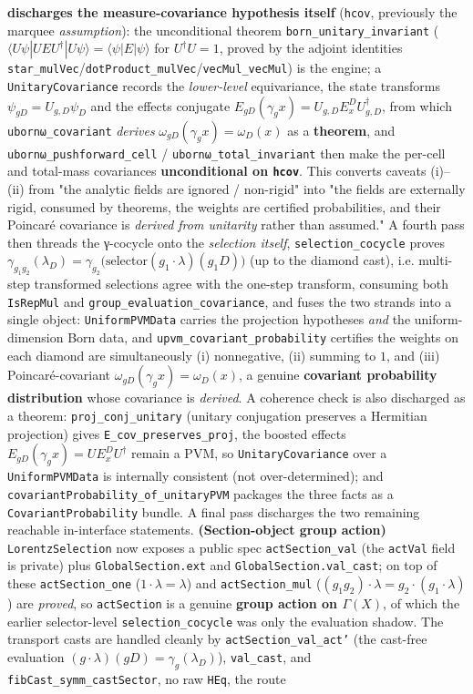 \documentclass[11pt,a4paper]{article}
\begin{document}
\begin{itemize}
\textbf{discharges the measure-covariance hypothesis itself} (\texttt{hcov}, previously the marquee \emph{assumption}): the unconditional theorem \texttt{born\_unitary\_invariant} ($\langle U\psi|UEU^\dagger|U\psi\rangle=\langle\psi|E|\psi\rangle$ for $U^\dagger U=1$, proved by the adjoint identities \texttt{star\_mulVec}/\texttt{dotProduct\_mulVec}/\texttt{vecMul\_vecMul}) is the engine; a \texttt{UnitaryCovariance} records the \emph{lower-level} equivariance, the state transforms $\psi_{gD}=U_{g,D}\psi_D$ and the effects conjugate $E_{gD}(\gamma_g x)=U_{g,D}E_x^D U_{g,D}^\dagger$, from which \texttt{ubornω\_covariant} \emph{derives} $\omega_{gD}(\gamma_g x)=\omega_D(x)$ as a \textbf{theorem}, and \texttt{ubornω\_pushforward\_cell} / \texttt{ubornω\_total\_invariant} then make the per-cell and total-mass covariances \textbf{unconditional on \texttt{hcov}}. This converts caveats (i)–(ii) from "the analytic fields are ignored / non-rigid" into "the fields are externally rigid, consumed by theorems, the weights are certified probabilities, and their Poincaré covariance is \emph{derived from unitarity} rather than assumed." A fourth pass then threads the γ-cocycle onto the \emph{selection itself}, \texttt{selection\_cocycle} proves $\gamma_{g_1 g_2}(\lambda_D)=\gamma_{g_2}\big(\text{selector}(g_1\!\cdot\!\lambda)(g_1 D)\big)$ (up to the diamond cast), i.e. multi-step transformed selections agree with the one-step transform, consuming both \texttt{IsRepMul} and \texttt{group\_evaluation\_covariance}, and fuses the two strands into a single object: \texttt{UniformPVMData} carries the projection hypotheses \emph{and} the uniform-dimension Born data, and \texttt{upvm\_covariant\_probability} certifies the weights on each diamond are simultaneously (i) nonnegative, (ii) summing to $1$, and (iii) Poincaré-covariant $\omega_{gD}(\gamma_g x)=\omega_D(x)$, a genuine \textbf{covariant probability distribution} whose covariance is \emph{derived}. A coherence check is also discharged as a theorem: \texttt{proj\_conj\_unitary} (unitary conjugation preserves a Hermitian projection) gives \texttt{E\_cov\_preserves\_proj}, the boosted effects $E_{gD}(\gamma_g x)=U E_x^D U^\dagger$ remain a PVM, so \texttt{UnitaryCovariance} over a \texttt{UniformPVMData} is internally consistent (not over-determined); and \texttt{covariantProbability\_of\_unitaryPVM} packages the three facts as a \texttt{CovariantProbability} bundle. A final pass discharges the two remaining reachable in-interface statements. \textbf{(Section-object group action)} \texttt{LorentzSelection} now exposes a public spec \texttt{actSection\_val} (the \texttt{actVal} field is private) plus \texttt{GlobalSection.ext} and \texttt{GlobalSection.val\_cast}; on top of these \texttt{actSection\_one} ($1\cdot\lambda=\lambda$) and \texttt{actSection\_mul} ($(g_1 g_2)\cdot\lambda = g_2\cdot(g_1\cdot\lambda)$) are \emph{proved}, so \texttt{actSection} is a genuine \textbf{group action on $\Gamma(X)$}, of which the earlier selector-level \texttt{selection\_cocycle} was only the evaluation shadow. The transport casts are handled cleanly by \texttt{actSection\_val\_act'} (the cast-free evaluation $(g\cdot\lambda)(gD)=\gamma_g(\lambda_D)$), \texttt{val\_cast}, and \texttt{fibCast\_symm\_castSector}, no raw \texttt{HEq}, the route 
\end{itemize}
\end{document}

